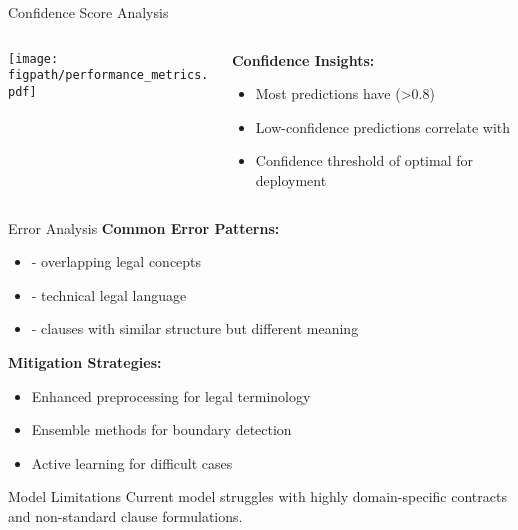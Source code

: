 \begin{frame}{Confidence Score Analysis}
\begin{columns}
\begin{column}{0.6\textwidth}
\begin{center}
\texttt{[image: \\figpath/performance\_metrics.pdf]}
\end{center}
\end{column}
\begin{column}{0.4\textwidth}
\textbf{Confidence Insights:}
\begin{itemize}
    \item Most predictions have  (>0.8)
    \item Low-confidence predictions correlate with 
    \item Confidence threshold of  optimal for deployment
\end{itemize}
\end{column}
\end{columns}
\end{frame}

\begin{frame}{Error Analysis}
\textbf{Common Error Patterns:}
\begin{itemize}
    \item {} - overlapping legal concepts
    \item {} - technical legal language
    \item {} - clauses with similar structure but different meaning
\end{itemize}

\vspace{0.5cm}
\textbf{Mitigation Strategies:}
\begin{itemize}
    \item Enhanced preprocessing for legal terminology
    \item Ensemble methods for boundary detection
    \item Active learning for difficult cases
\end{itemize}

\vspace{0.5cm}
\begin{alertblock}{Model Limitations}
Current model struggles with highly domain-specific contracts and non-standard clause formulations.
\end{alertblock}
\end{frame}
